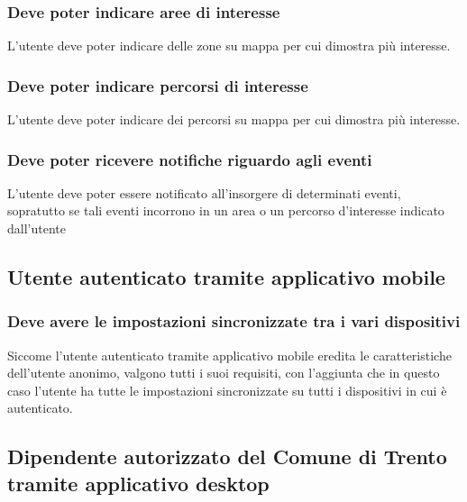 \documentclass{article}
\begin{document}
\subsubsection{Deve poter indicare aree di interesse}
\label{5.1.8}
L'utente deve poter indicare delle zone su mappa per cui dimostra più interesse.

\subsubsection{Deve poter indicare percorsi di interesse}
\label{5.1.9}
L'utente deve poter indicare dei percorsi su mappa per cui dimostra più interesse.

\subsubsection{Deve poter ricevere notifiche riguardo agli eventi}
\label{5.1.10}
L'utente deve poter essere notificato all'insorgere di determinati eventi, sopratutto se tali eventi incorrono in un area o un percorso d'interesse indicato dall'utente

\subsection{Utente autenticato tramite applicativo mobile}

\subsubsection{Deve avere le impostazioni sincronizzate tra i vari dispositivi}
\label{5.2.1}
Siccome l'utente autenticato tramite applicativo mobile eredita le caratteristiche dell'utente anonimo, valgono tutti i suoi requisiti, con l'aggiunta che in questo caso l'utente ha tutte le impostazioni sincronizzate su tutti i dispositivi in cui è autenticato.

\subsection{Dipendente autorizzato del Comune di Trento tramite applicativo desktop}
\end{document}
